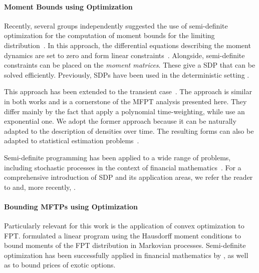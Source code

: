 \paragraph{Moment Bounds using Optimization} Recently, several groups independently suggested the use of semi-definite
optimization for the computation of moment bounds for the limiting
distribution~\parencite{ghusinga2017exact,dowdy2018bounds,kuntz2017rigorous,sakurai2017convex}.
In this approach, the differential equations describing the moment dynamics are
set to zero and form linear constraints~\parencite{backenkohler2018moment}. Alongside, semi-definite constraints can
be placed on the \emph{moment matrices}. These give a \acf{SDP}
that can be solved efficiently.
Previously, \acp{SDP} have been used in the deterministic setting \parencite{hasenauer2009guaranteed}.

This approach has been extended to the transient
case~\parencite{dowdy2018dynamic,sakurai2019bounding}.
The approach is similar in both works and is a cornerstone of the \ac{MFPT} analysis
presented here.
They differ mainly by the fact that \citet{sakurai2019bounding} apply a polynomial
time-weighting, while \citet{dowdy2018dynamic} use an
exponential one. We adopt the former approach because it
can be naturally adapted to the description of densities over time.
The resulting forms can also be adapted to statistical estimation
problems~\parencite{backenkohler2019control}.

Semi-definite programming has been applied to a wide range of problems,
including stochastic processes in the context of financial
mathematics~\parencite{lasserre2006pricing,kashima2009polynomial}.
For a comprehensive introduction of \ac{SDP} and its application areas, we refer
the reader to \citet{parrilo2003semidefinite} and, more recently,
\citet{lasserre2010moments}.

\paragraph{Bounding MFTPs using Optimization}
Particularly relevant for this work is the application of convex optimization to
\ac{FPT}\@.
\citet{helmes2001computing} formulated a linear program using the
Hausdorff moment conditions \parencite{hausdorff} to bound moments of the
\ac{FPT} distribution in Markovian processes.
Semi-definite optimization has been successfully applied in financial
mathematics by \citet{kashima2009polynomial}, as well as
\citet{lasserre2006pricing} to bound prices of exotic options.

